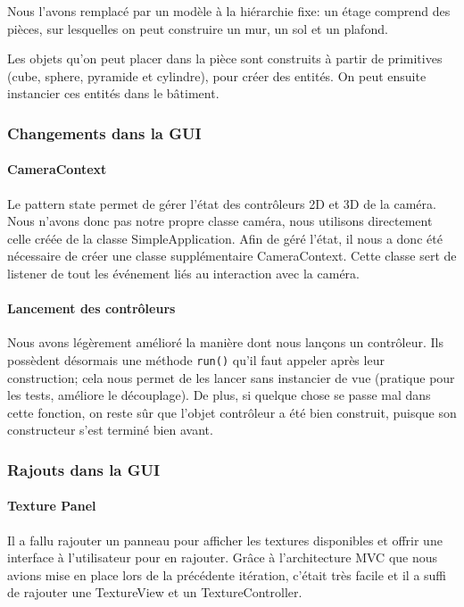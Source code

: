 	Nous l'avons remplacé par un modèle à la hiérarchie fixe: un étage comprend des pièces, sur lesquelles on peut construire un mur, un sol et un plafond.

	Les objets qu'on peut placer dans la pièce sont construits à partir de primitives (cube, sphere, pyramide et cylindre), pour créer des entités. On peut ensuite instancier ces entités dans le bâtiment.

	\subsubsection{Changements dans la GUI}

		\paragraph{CameraContext}
		Le pattern state permet de gérer l'état des contrôleurs 2D et 3D de la caméra. Nous n'avons donc pas notre propre classe caméra, nous utilisons directement celle créée de la classe SimpleApplication. Afin de géré l'état, il nous a donc été nécessaire de créer une classe supplémentaire CameraContext. Cette classe sert de listener de tout les événement liés au interaction avec la caméra.

		\paragraph{Lancement des contrôleurs}
		Nous avons légèrement amélioré la manière dont nous lançons un contrôleur.
		Ils possèdent désormais une méthode \texttt{run()} qu'il faut appeler
		après leur construction; cela nous permet de les lancer sans instancier
		de vue (pratique pour les tests, améliore le découplage). De plus, si 
		quelque chose se passe mal dans cette fonction, on reste sûr que 
		l'objet contrôleur a été bien construit, puisque son constructeur s'est
		terminé bien avant. 

	\subsubsection{Rajouts dans la GUI}

		\paragraph{Texture Panel}
		Il a fallu rajouter un panneau pour afficher les textures disponibles et
		offrir une interface à l'utilisateur pour en rajouter. Grâce à 
		l'architecture MVC que nous avions mise en place lors de la précédente 
		itération, c'était très facile et il a suffi de rajouter une TextureView
		et un TextureController.

